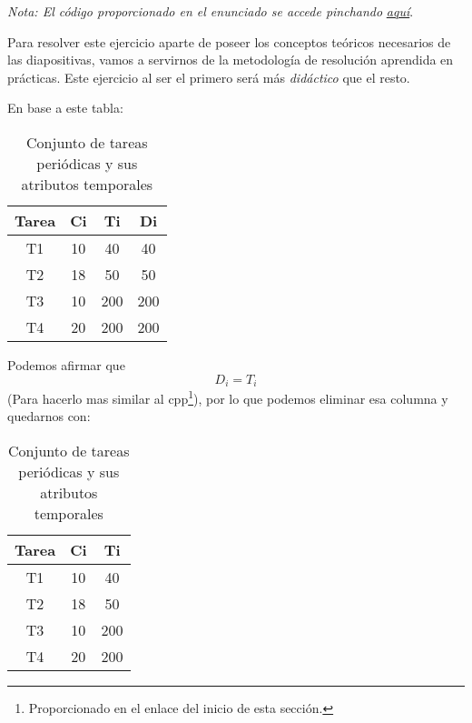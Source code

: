 \documentclass[a4paper,12pt]{article}
\begin{document}
\begin{tcolorbox}[colback=gray!5!white,colframe=gray!75!black]
    \textit{Nota: El código proporcionado en el enunciado se accede pinchando }\href{https://github.com/ElblogdeIsmael/ElblogdeIsmael.github.io/blob/main/Asignaturas/Tercer%20A%C3%B1o/SCD/Practicas/Practicas_Resueltas/Practica4/scd-p4-fuentes/SOLUCION_ACTIVIDAD_CLASE/ejecutivo2.cpp}{\textit{aquí}}.
\end{tcolorbox}

Para resolver este ejercicio aparte de poseer los conceptos teóricos necesarios de las diapositivas, vamos a servirnos de la metodología de resolución aprendida en prácticas. Este ejercicio al ser el primero será más \textit{didáctico} que el resto.

En base a este tabla:

\begin{table}[H]
    \centering
    \begin{tabular}{|c|c|c|c|}
    \hline
    \textbf{Tarea} & \textbf{Ci} & \textbf{Ti} & \textbf{Di} \\ \hline
    T1 & 10 & 40 & 40 \\ \hline
    T2 & 18 & 50 & 50 \\ \hline
    T3 & 10 & 200 & 200 \\ \hline
    T4 & 20 & 200 & 200 \\ \hline
    \end{tabular}
    \caption{Conjunto de tareas periódicas y sus atributos temporales}
\end{table}

Podemos afirmar que \[D_i = T_i \] (Para hacerlo mas similar al cpp\footnote{Proporcionado en el enlace del inicio de esta sección.}),  por lo que podemos eliminar esa columna y quedarnos con:

\begin{table}[H]
    \centering
    \begin{tabular}{|c|c|c|}
    \hline
    \textbf{Tarea} & \textbf{Ci} & \textbf{Ti} \\ \hline
    T1 & 10 & 40 \\ \hline
    T2 & 18 & 50 \\ \hline
    T3 & 10 & 200 \\ \hline
    T4 & 20 & 200 \\ \hline
    \end{tabular}
    \caption{Conjunto de tareas periódicas y sus atributos temporales}
\end{table}
\end{document}
